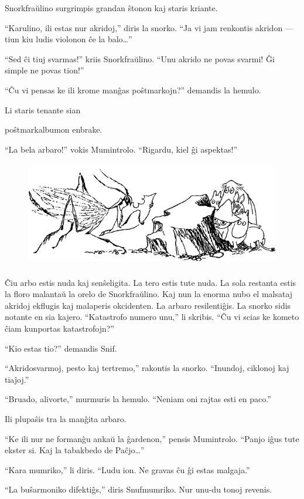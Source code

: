 Snorkfraŭlino surgrimpis grandan ŝtonon kaj staris kriante.

``Karulino, ili estas nur akridoj,'' diris la snorko. ``Ja vi jam renkontis akridon --- tiun kiu ludis violonon ĉe la balo{\ldots}''

``Sed ĉi tiuj svarmas!'' kriis Snorkfraŭlino. ``Unu akrido ne povas svarmi! Ĝi simple ne povas tion!''

``Ĉu vi pensas ke ili krome manĝas poŝtmarkojn?'' demandis la hemulo.

Li staris tenante sian

poŝtmarkalbumon enbrake.

``La bela arbaro!'' vokis Mumintrolo. ``Rigardu, kiel ĝi aspektas!''

\begin{figure}[htbp]
\centering
\includegraphics[width=350pt,height=131pt]{8-5.png}
\caption{}
\label{8-5}
\end{figure}

Ĉiu arbo estis nuda kaj senŝeligita. La tero estis tute nuda. La sola restanta estis la floro malantaŭ la orelo de Snorkfraŭlino. Kaj nun la enorma nubo el malsataj akridoj ekflugis kaj malaperis okcidenten. La arbaro resilentiĝis. La snorko sidis notante en sia kajero. ``Katastrofo numero unu,'' li skribis. ``Ĉu vi scias ke kometo ĉiam kunportas katastrofojn?''

``Kio estas tio?'' demandis Snif.

``Akridosvarmoj, pesto kaj tertremo,'' rakontis la snorko. ``Inundoj, ciklonoj kaj tiaĵoj.''

``Bruado, alivorte,'' murmuris la hemulo. ``Neniam oni rajtas esti en paco.''

Ili plupaŝis tra la manĝita arbaro.

``Ke ili nur ne formanĝu ankaŭ la ĝardenon,'' pensis Mumintrolo. ``Panjo iĝus tute ekster si. Kaj la tabakbedo de Paĉjo{\ldots}''

``Kara mumriko,'' li diris. ``Ludu ion. Ne gravas ĉu ĝi estas malgaja.''

``La buŝarmoniko difektiĝs,'' diris Snufmumriko. Nur unu-du tonoj revenis.

